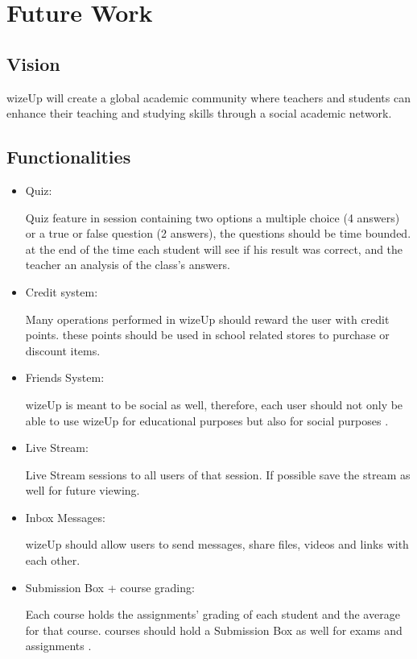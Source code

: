 \documentclass[12pt,a4paper]{article}
\begin{document}
    \newpage
    \section{Future Work}

    \subsection{Vision}

    wizeUp will create a global academic community where teachers and students can enhance their teaching and studying skills through a social academic network.

    \subsection{Functionalities}
    \begin{itemize}
        \item Quiz:

        Quiz feature \cite{benefitsonlinelearning} in session containing two options a multiple choice (4 answers) or a true or false question (2 answers), the questions should be time bounded. at the end of the time each student will see if  his result was correct, and the teacher an analysis of the class's answers.


        \item Credit system:

        Many operations performed in wizeUp should reward the user with credit points. these points should be used in school related stores to purchase or discount items.

        \item Friends System:

        wizeUp is meant to be social as well, therefore, each user should not only be able to use wizeUp for educational purposes but also for social purposes \cite{socialnetwork}.

        \item Live Stream:

        Live Stream sessions to all users of that session. If possible save the stream as well for future viewing.

        \item Inbox Messages:

        wizeUp should allow users to send messages, share files, videos and links with each other.

        \item Submission Box + course grading:

        Each course holds the assignments' grading of each student and  the average for that course.
        courses should hold a Submission Box as well for exams and assignments \cite{flippedlearning, classroomofone}.

    \end{itemize}
\end{document}

